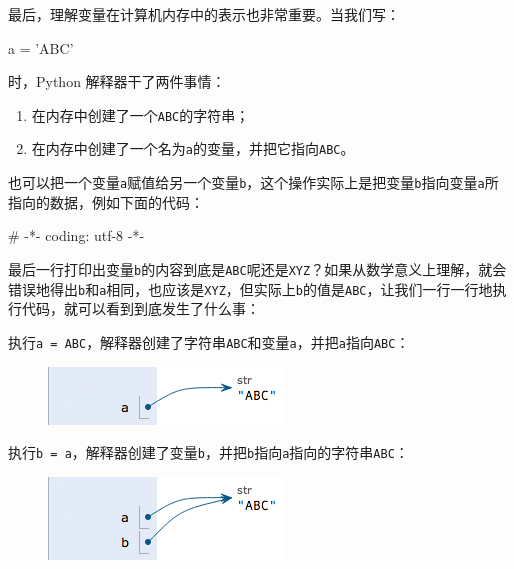 最后，理解变量在计算机内存中的表示也非常重要。当我们写：

\begin{pythoncode}
a = 'ABC'
\end{pythoncode}

时，Python 解释器干了两件事情：

\begin{enumerate}
\def\labelenumi{\arabic{enumi}.}
\item
  在内存中创建了一个\texttt{\textquotesingle{}ABC\textquotesingle{}}的字符串；
\item
  在内存中创建了一个名为\texttt{a}的变量，并把它指向\texttt{\textquotesingle{}ABC\textquotesingle{}}。
\end{enumerate}

也可以把一个变量\texttt{a}赋值给另一个变量\texttt{b}，这个操作实际上是把变量\texttt{b}指向变量\texttt{a}所指向的数据，例如下面的代码：

\begin{pythoncode}
# -*- coding: utf-8 -*-
\end{pythoncode}

最后一行打印出变量\texttt{b}的内容到底是\texttt{\textquotesingle{}ABC\textquotesingle{}}呢还是\texttt{\textquotesingle{}XYZ\textquotesingle{}}？如果从数学意义上理解，就会错误地得出\texttt{b}和\texttt{a}相同，也应该是\texttt{\textquotesingle{}XYZ\textquotesingle{}}，但实际上\texttt{b}的值是\texttt{\textquotesingle{}ABC\textquotesingle{}}，让我们一行一行地执行代码，就可以看到到底发生了什么事：

执行\texttt{a\ =\ \textquotesingle{}ABC\textquotesingle{}}，解释器创建了字符串\texttt{\textquotesingle{}ABC\textquotesingle{}}和变量\texttt{a}，并把\texttt{a}指向\texttt{\textquotesingle{}ABC\textquotesingle{}}：

 
 \begin{figure}[htp]
	\centering
	\includegraphics[width=0.6\linewidth]{fig/9237918782554560.png}
\end{figure}


执行\texttt{b\ =\ a}，解释器创建了变量\texttt{b}，并把\texttt{b}指向\texttt{a}指向的字符串\texttt{\textquotesingle{}ABC\textquotesingle{}}：

 
 \begin{figure}[htp]
	\centering
	\includegraphics[width=0.6\linewidth]{fig/9237920586134400.png}
\end{figure}


